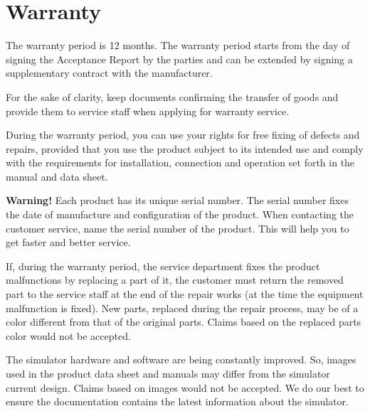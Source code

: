 {
    \section{Warranty}

    The warranty period is 12 months. 
    The warranty period starts from the day of signing the Acceptance Report by the parties and can be extended by signing a supplementary contract with the manufacturer.

    For the sake of clarity, keep documents confirming the transfer of goods and provide them to service staff when applying for warranty service.

    During the warranty period, you can use your rights for free fixing of defects and repairs, provided that you use the product subject to its intended use and comply with the requirements for installation, connection and operation set forth in the manual and data sheet.

    {\textcolor[rgb]{1,0,0}{\textbf{Warning!}}} Each product has its unique serial number. The serial number fixes the date of manufacture  and configuration of the product. 
    When contacting the customer service, name the serial number of the product. This will help you to get faster and better service.

    If, during the warranty period, the service department fixes the product malfunctions by replacing a part of it, the customer must return the removed part to the service staff at the end of the repair works (at the time the equipment malfunction is fixed).
    New parts, replaced during the repair process, may be of a color different from that of the original parts. Claims based on the replaced parts color would not be accepted.
    
    The simulator hardware and software are being constantly improved. So, images used in the product data sheet and manuals may differ from the simulator current design. Claims based on images would not be accepted. We do our best to ensure the documentation contains the latest information about the simulator.
    
}
